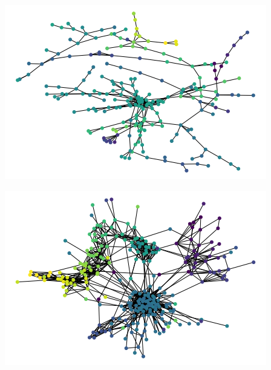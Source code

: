 \documentclass[10pt]{article}
\begin{document}
\begin{center}
\begin{minipage}{0.48\linewidth}
\includegraphics[width=\linewidth]{images/final1558604791.png}
\end{minipage}%
\hfill
\begin{minipage}{0.49\linewidth}
\includegraphics[width=\linewidth]{images/final1558604650.png}
\end{minipage}
\end{center}
\end{document}

